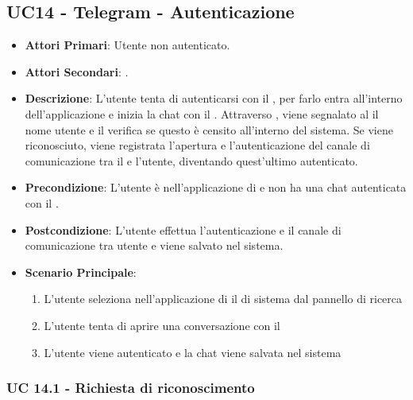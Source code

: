 \subsection{UC14 - Telegram  - Autenticazione}
		
		
	\begin{itemize}
		\item \textbf{Attori Primari}: Utente non autenticato.
		\item \textbf{Attori Secondari}: .
		\item \textbf{Descrizione}: L'utente tenta di autenticarsi con il  , per farlo entra all'interno dell'applicazione e inizia la chat con il . Attraverso , viene segnalato al  il nome utente e il  verifica se questo è censito all'interno del sistema. Se viene riconosciuto, viene registrata l'apertura e l'autenticazione del canale di comunicazione tra il  e l'utente, diventando quest'ultimo autenticato. 
		\item \textbf{Precondizione}: L'utente è nell'applicazione di  e non ha una chat autenticata con il .
		\item \textbf{Postcondizione}: L'utente effettua l'autenticazione e il canale di comunicazione tra utente e  viene salvato nel sistema.
		\item \textbf{Scenario Principale}:
		\begin{enumerate}
			\item L'utente seleziona nell'applicazione di  il  di sistema dal pannello di ricerca
			\item L'utente tenta di aprire una conversazione con il 
			\item L'utente viene autenticato e la chat viene salvata nel sistema
		\end{enumerate}
	\end{itemize}
	
	\subsubsection{UC 14.1 - Richiesta di riconoscimento}

